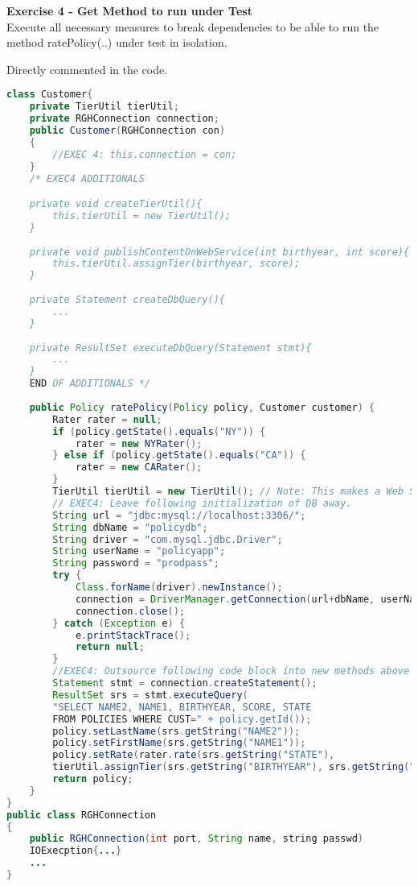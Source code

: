 \textbf{Exercise 4 - Get Method to run under Test} \\
Execute all necessary measures to break dependencies to be able to run the method ratePolicy(..) under test in isolation.

Directly commented in the code.

\columnbreak

\begin{lstlisting}[language=Java]
class Customer{
    private TierUtil tierUtil;
    private RGHConnection connection;
    public Customer(RGHConnection con)
    {
        //EXEC 4: this.connection = con;
    }
    /* EXEC4 ADDITIONALS

    private void createTierUtil(){
        this.tierUtil = new TierUtil();
    }
    
    private void publishContentOnWebService(int birthyear, int score){
        this.tierUtil.assignTier(birthyear, score);
    }
    
    private Statement createDbQuery(){
        ...
    }
    
    private ResultSet executeDbQuery(Statement stmt){
        ...
    }
    END OF ADDITIONALS */
    
    public Policy ratePolicy(Policy policy, Customer customer) {
        Rater rater = null;
        if (policy.getState().equals("NY")) {
            rater = new NYRater();
        } else if (policy.getState().equals("CA")) {
            rater = new CARater();
        }
        TierUtil tierUtil = new TierUtil(); // Note: This makes a Web Services
        // EXEC4: Leave following initialization of DB away.
        String url = "jdbc:mysql://localhost:3306/";
        String dbName = "policydb";
        String driver = "com.mysql.jdbc.Driver";
        String userName = "policyapp";
        String password = "prodpass";
        try {
            Class.forName(driver).newInstance();
            connection = DriverManager.getConnection(url+dbName, userName,password);
            connection.close();
        } catch (Exception e) {
            e.printStackTrace();
            return null;
        }
        //EXEC4: Outsource following code block into new methods above
        Statement stmt = connection.createStatement();
        ResultSet srs = stmt.executeQuery(
        "SELECT NAME2, NAME1, BIRTHYEAR, SCORE, STATE
        FROM POLICIES WHERE CUST=" + policy.getId());
        policy.setLastName(srs.getString("NAME2"));
        policy.setFirstName(srs.getString("NAME1"));
        policy.setRate(rater.rate(srs.getString("STATE"),
        tierUtil.assignTier(srs.getString("BIRTHYEAR"), srs.getString("SCORE"))));
        return policy;
    }
}
public class RGHConnection
{
    public RGHConnection(int port, String name, string passwd)
    IOExecption{...}
    ...
}
\end{lstlisting}

\clearpage


